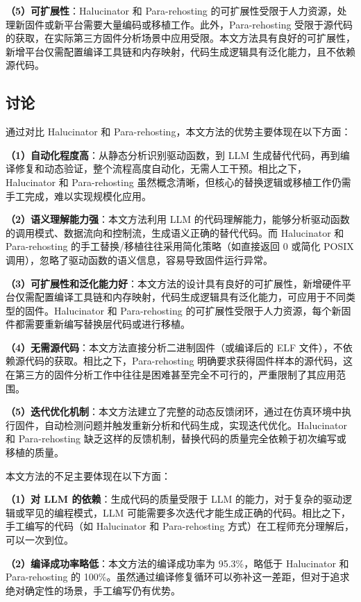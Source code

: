 \textbf{（5）可扩展性}：Halucinator 和 Para-rehosting 的可扩展性受限于人力资源，处理新固件或新平台需要大量编码或移植工作。此外，Para-rehosting 受限于源代码的获取，在实际第三方固件分析场景中应用受限。本文方法具有良好的可扩展性，新增平台仅需配置编译工具链和内存映射，代码生成逻辑具有泛化能力，且不依赖源代码。

\subsection{讨论}

通过对比 Halucinator 和 Para-rehosting，本文方法的优势主要体现在以下方面：

\textbf{（1）自动化程度高}：从静态分析识别驱动函数，到 LLM 生成替代代码，再到编译修复和动态验证，整个流程高度自动化，无需人工干预。相比之下，Halucinator 和 Para-rehosting 虽然概念清晰，但核心的替换逻辑或移植工作仍需手工完成，难以实现规模化应用。

\textbf{（2）语义理解能力强}：本文方法利用 LLM 的代码理解能力，能够分析驱动函数的调用模式、数据流向和控制流，生成语义正确的替代代码。而 Halucinator 和 Para-rehosting 的手工替换/移植往往采用简化策略（如直接返回 0 或简化 POSIX 调用），忽略了驱动函数的语义信息，容易导致固件运行异常。

\textbf{（3）可扩展性和泛化能力好}：本文方法的设计具有良好的可扩展性，新增硬件平台仅需配置编译工具链和内存映射，代码生成逻辑具有泛化能力，可应用于不同类型的固件。Halucinator 和 Para-rehosting 的可扩展性受限于人力资源，每个新固件都需要重新编写替换层代码或进行移植。

\textbf{（4）无需源代码}：本文方法直接分析二进制固件（或编译后的 ELF 文件），不依赖源代码的获取。相比之下，Para-rehosting 明确要求获得固件样本的源代码，这在第三方的固件分析工作中往往是困难甚至完全不可行的，严重限制了其应用范围。

\textbf{（5）迭代优化机制}：本文方法建立了完整的动态反馈闭环，通过在仿真环境中执行固件，自动检测问题并触发重新分析和代码生成，实现迭代优化。Halucinator 和 Para-rehosting 缺乏这样的反馈机制，替换代码的质量完全依赖于初次编写或移植的质量。

本文方法的不足主要体现在以下方面：

\textbf{（1）对 LLM 的依赖}：生成代码的质量受限于 LLM 的能力，对于复杂的驱动逻辑或罕见的编程模式，LLM 可能需要多次迭代才能生成正确的代码。相比之下，手工编写的代码（如 Halucinator 和 Para-rehosting 方式）在工程师充分理解后，可以一次到位。

\textbf{（2）编译成功率略低}：本文方法的编译成功率为 95.3\%，略低于 Halucinator 和 Para-rehosting 的 100\%。虽然通过编译修复循环可以弥补这一差距，但对于追求绝对确定性的场景，手工编写仍有优势。


